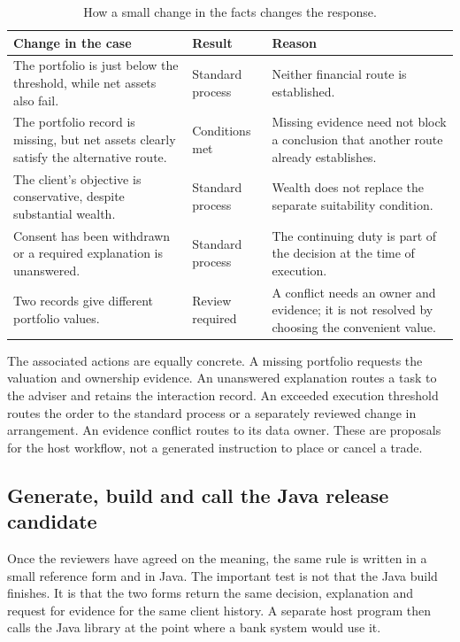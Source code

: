 \documentclass[12pt,a4paper,oneside,openany]{book}
\begin{document}
\begin{table}[H]
\centering
\caption{How a small change in the facts changes the response.}
\label{tab:dry-cases-summary}
\begin{tabularx}{0.96\textwidth}{P{0.35\textwidth}P{0.22\textwidth}Y}
\toprule
Change in the case & Result & Reason \\ \midrule
The portfolio is just below the threshold, while net assets also fail. & Standard process & Neither financial route is established. \\
\addlinespace[0.5em]
The portfolio record is missing, but net assets clearly satisfy the alternative route. & Conditions met & Missing evidence need not block a conclusion that another route already establishes. \\
\addlinespace[0.5em]
The client's objective is conservative, despite substantial wealth. & Standard process & Wealth does not replace the separate suitability condition. \\
\addlinespace[0.5em]
Consent has been withdrawn or a required explanation is unanswered. & Standard process & The continuing duty is part of the decision at the time of execution. \\
\addlinespace[0.5em]
Two records give different portfolio values. & Review required & A conflict needs an owner and evidence; it is not resolved by choosing the convenient value. \\
\bottomrule
\end{tabularx}
\end{table}


The associated actions are equally concrete. A missing portfolio requests the
valuation and ownership evidence. An unanswered explanation routes a task to the
adviser and retains the interaction record. An exceeded execution threshold
routes the order to the standard process or a separately reviewed change in
arrangement. An evidence conflict routes to its data owner. These are proposals
for the host workflow, not a generated instruction to place or cancel a trade.

\subsection{Generate, build and call the Java release candidate}
\label{merge:P-01b-complete-dry-run:05}


Once the reviewers have agreed on the meaning, the same rule is written in a
small reference form and in Java. The important test is not that the Java build
finishes. It is that the two forms return the same decision, explanation and
request for evidence for the same client history. A separate host program then
calls the Java library at the point where a bank system would use it.
\end{document}
